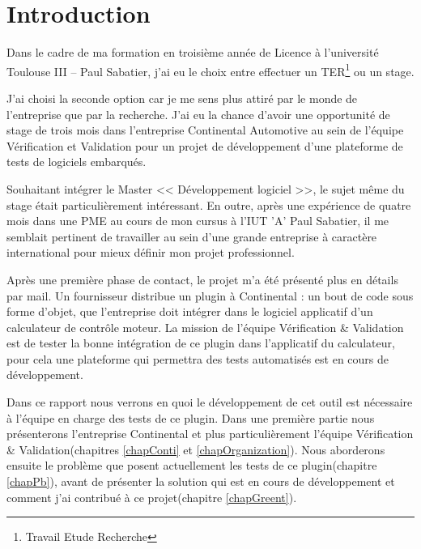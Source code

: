 \chapter*{Introduction}
Dans le cadre de ma formation en troisième année de Licence à l'université Toulouse III – Paul Sabatier, j'ai eu le choix entre effectuer un TER\footnote{Travail Etude Recherche} ou un stage. 

J'ai choisi la seconde option car je me sens plus attiré par le monde de l'entreprise que par la recherche. J'ai eu la chance d'avoir une opportunité de stage de trois mois dans l'entreprise Continental Automotive au sein de l'équipe Vérification et Validation pour un projet de développement d'une plateforme de tests de logiciels embarqués.

Souhaitant intégrer le Master << Développement logiciel >>, le sujet même du stage était particulièrement intéressant. En outre, après une expérience de quatre mois dans une PME au cours de mon cursus à l'IUT 'A' Paul Sabatier, il me semblait pertinent de travailler au sein d'une grande entreprise à caractère international pour mieux définir mon projet professionnel.

Après une première phase de contact, le projet m'a été présenté plus en détails par mail. Un fournisseur distribue un plugin à Continental : un bout de code sous
forme d'objet, que l'entreprise doit intégrer dans le logiciel applicatif d'un calculateur de contrôle moteur. La mission de l'équipe Vérification \&
Validation est de tester la bonne intégration de ce plugin dans l'applicatif du calculateur, pour cela une plateforme qui permettra des tests automatisés est en
cours de développement.

Dans ce rapport nous verrons en quoi le développement de cet outil est nécessaire à l'équipe en charge des tests de ce plugin. Dans une première partie nous présenterons l'entreprise Continental et plus particulièrement l'équipe Vérification \& Validation(chapitres \ref{chapConti} et \ref{chapOrganization}). Nous aborderons ensuite le problème que posent actuellement les tests de ce plugin(chapitre \ref{chapPb}), avant de présenter la solution qui est en cours de développement et comment j'ai contribué à ce projet(chapitre \ref{chapGreent}). 

